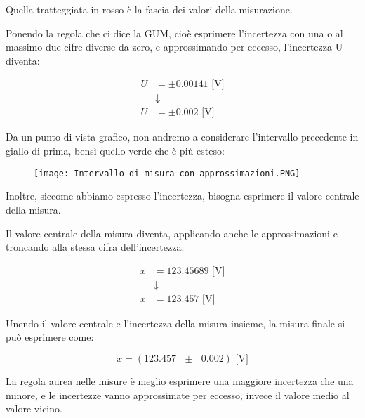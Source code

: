 Quella tratteggiata in rosso è la fascia dei valori della misurazione. \newline 

Ponendo la regola che ci dice la GUM, cioè esprimere l'incertezza 
con una o al massimo due cifre diverse da zero, e approssimando per eccesso, 
l'incertezza U diventa: 

{
    \Large 
    \begin{equation}
        \begin{split}
             U &= \pm 0.001 41 \text{ [V]}
             \\
             &\downarrow
             \\
             U &= \pm 0.002 \text{ [V]}
        \end{split}
    \end{equation}
}

Da un punto di vista grafico, non andremo a considerare l'intervallo precedente in giallo di prima, 
bensì quello verde che è più esteso:

\begin{figure}[h]
    \centering
    \texttt{[image: Intervallo di misura con approssimazioni.PNG]}
\end{figure}


Inoltre, siccome abbiamo espresso l'incertezza, bisogna esprimere il valore centrale della misura. \newline 

Il valore centrale della misura diventa, 
applicando anche le approssimazioni e troncando alla stessa cifra dell'incertezza: 

{
    \Large 
    \begin{equation}
        \begin{split}
            x &= 123.456 89 \text{ [V]}
            \\ 
            &\downarrow 
            \\ 
            x &= 123.457 \text{ [V]}
        \end{split}  
    \end{equation}
}

Unendo il valore centrale e l'incertezza della misura insieme, 
la misura finale si può esprimere come: 

{
    \Large 
    \begin{equation}
        x = (123.457 \text{ } \pm \text{ } 0.002) \text{ [V]}
    \end{equation}
}

La regola aurea nelle misure è meglio esprimere una maggiore incertezza che una minore, 
e le incertezze vanno approssimate per eccesso, 
invece il valore medio al valore vicino. \newline 


